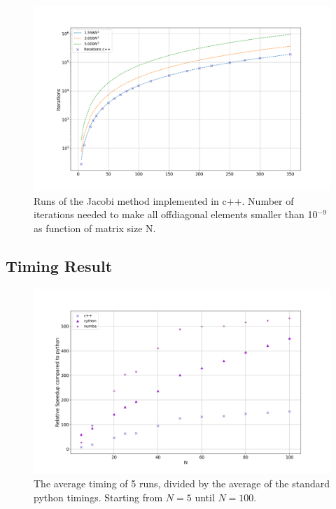 \begin{figure}[H]
  \centering
  \includegraphics[width=1.0\textwidth]{../figures/iterations.png}

  \caption{Runs of the Jacobi method implemented in c++. Number of iterations
  needed to make all offdiagonal elements smaller than 10$^{-9}$ as function of
  matrix size N.}

  \label{fig:iterations}
\end{figure}


\subsection{Timing Result}

\begin{figure}[H]
  \centering
  \includegraphics[width=1.0\textwidth]{../figures/avgspeed.png}
  \caption{ The average timing of 5 runs, divided by the average of the standard
  python timings. Starting from $N=5$ until $N=100$. }
  \label{fig:comp_python}
\end{figure}

